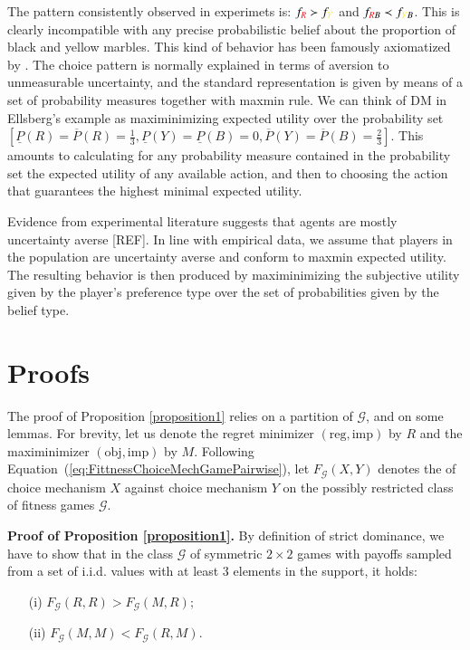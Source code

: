 \documentclass[fleqn,reqno,11pt]{article}
\begin{document}
The pattern consistently observed in experimets is:
$f_{{\color{red}R}} \succ f_{{\color{yellow}Y}}$ and
$f_{{\color{red}R}B} \prec f_{{\color{yellow}Y}B}$. This is clearly incompatible with any
precise probabilistic belief about the proportion of black and yellow marbles. This kind of
behavior has been famously axiomatized by \citet{gilsch89}. The
choice pattern is normally explained in terms of aversion to unmeasurable uncertainty, and the standard
representation is given by means of a set of probability measures together with maxmin rule. We
can think of DM in Ellsberg's example as maximinimizing expected utility over the
probability set
$
[\underline{P}(R)=\overline{P}(R)=\frac{1}{3}, \underline{P}(Y)= \underline{P}(B)=0, \overline{P}(Y)= \overline{P}(B)=\frac{2}{3}]
$.
This amounts to calculating for any probability measure contained in the probability set the
expected utility of any available action, and then to choosing the action that guarantees the
highest minimal expected utility. 

Evidence from experimental literature suggests that agents are mostly uncertainty averse
[REF]. In line with empirical data, we assume that players in the population are uncertainty
averse and conform to maxmin expected utility. The resulting behavior is then produced by
maximinimizing the subjective utility given by the player's preference type over the set of
probabilities given by the belief type.


\section{Proofs}
\label{sec:proofs}

The proof of Proposition \ref{proposition1} relies on a partition of $\mathcal{G}$, and on some
lemmas. For brevity, let us denote the regret minimizer $(\text{reg}, \text{imp})$ by $R$ and
the maximinimizer $(\text{obj}, \text{imp})$ by $M$. Following
Equation~(\ref{eq:FittnessChoiceMechGamePairwise}), let $F_{\mathcal{G}}(X,Y)$ denotes the of
choice mechanism $X$ against choice mechanism $Y$ on the possibly restricted class of fitness
games $\mathcal{G}$.

\vspace{.5cm}


\noindent \textbf{Proof of Proposition \ref{proposition1}.} By definition of strict dominance,
we have to show that in the class $\mathcal{G}$ of symmetric $2\times2$ games with payoffs
sampled from a set of i.i.d. values with at least 3 elements in the support, it holds:
\begin{multicols}{2}
  \begin{itemize}
  \item[(i)] $F_{\mathcal{G}}(R,R)>F_{\mathcal{G}}(M,R);$
  \item[(ii)] $F_{\mathcal{G}}(M,M)<F_{\mathcal{G}}(R,M).$
  \end{itemize}
\end{multicols}
\end{document}
